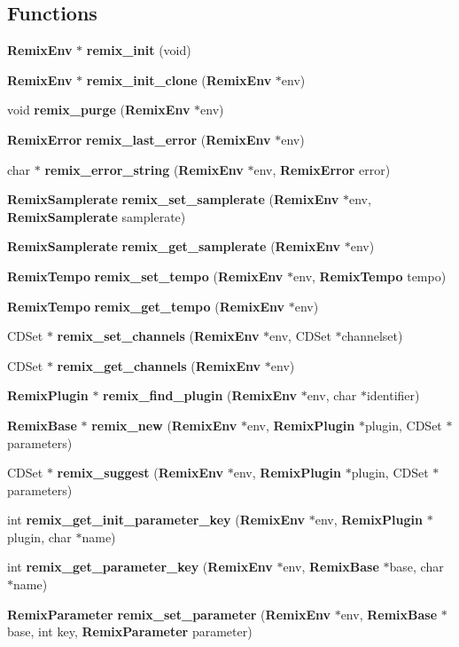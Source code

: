 \subsection*{Functions}
\begin{CompactItemize}
\item 
{\bf Remix\-Env} $\ast$ {\bf remix\_\-init} (void)
\item 
{\bf Remix\-Env} $\ast$ {\bf remix\_\-init\_\-clone} ({\bf Remix\-Env} $\ast$env)
\item 
void {\bf remix\_\-purge} ({\bf Remix\-Env} $\ast$env)
\item 
{\bf Remix\-Error} {\bf remix\_\-last\_\-error} ({\bf Remix\-Env} $\ast$env)
\item 
char $\ast$ {\bf remix\_\-error\_\-string} ({\bf Remix\-Env} $\ast$env, {\bf Remix\-Error} error)
\item 
{\bf Remix\-Samplerate} {\bf remix\_\-set\_\-samplerate} ({\bf Remix\-Env} $\ast$env, {\bf Remix\-Samplerate} samplerate)
\item 
{\bf Remix\-Samplerate} {\bf remix\_\-get\_\-samplerate} ({\bf Remix\-Env} $\ast$env)
\item 
{\bf Remix\-Tempo} {\bf remix\_\-set\_\-tempo} ({\bf Remix\-Env} $\ast$env, {\bf Remix\-Tempo} tempo)
\item 
{\bf Remix\-Tempo} {\bf remix\_\-get\_\-tempo} ({\bf Remix\-Env} $\ast$env)
\item 
CDSet $\ast$ {\bf remix\_\-set\_\-channels} ({\bf Remix\-Env} $\ast$env, CDSet $\ast$channelset)
\item 
CDSet $\ast$ {\bf remix\_\-get\_\-channels} ({\bf Remix\-Env} $\ast$env)
\item 
{\bf Remix\-Plugin} $\ast$ {\bf remix\_\-find\_\-plugin} ({\bf Remix\-Env} $\ast$env, char $\ast$identifier)
\item 
{\bf Remix\-Base} $\ast$ {\bf remix\_\-new} ({\bf Remix\-Env} $\ast$env, {\bf Remix\-Plugin} $\ast$plugin, CDSet $\ast$parameters)
\item 
CDSet $\ast$ {\bf remix\_\-suggest} ({\bf Remix\-Env} $\ast$env, {\bf Remix\-Plugin} $\ast$plugin, CDSet $\ast$parameters)
\item 
int {\bf remix\_\-get\_\-init\_\-parameter\_\-key} ({\bf Remix\-Env} $\ast$env, {\bf Remix\-Plugin} $\ast$plugin, char $\ast$name)
\item 
int {\bf remix\_\-get\_\-parameter\_\-key} ({\bf Remix\-Env} $\ast$env, {\bf Remix\-Base} $\ast$base, char $\ast$name)
\item 
{\bf Remix\-Parameter} {\bf remix\_\-set\_\-parameter} ({\bf Remix\-Env} $\ast$env, {\bf Remix\-Base} $\ast$base, int key, {\bf Remix\-Parameter} parameter)

\end{CompactItemize}
